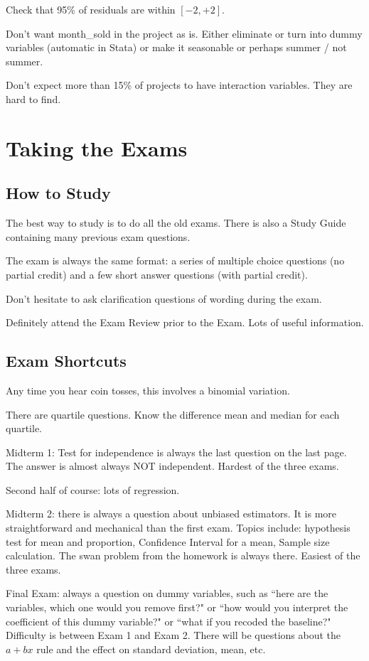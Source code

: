 \documentclass[11pt, oneside]{article}   	%
\begin{document}
Check that 95\% of residuals are within $[-2, +2]$.

Don't want month\_sold in the project as is. Either eliminate or turn into dummy variables  (automatic in Stata) or make it seasonable or perhaps summer / not summer.  

Don't expect more than 15\% of projects to have interaction variables. They are hard to find.


\section{Taking the Exams}
\subsection{How to Study}
The best way to study is to do all the old exams. There is also a Study Guide containing many previous exam questions.

The exam is always the same format: a series of multiple choice questions (no partial credit) and a few short answer questions (with partial credit).

Don't hesitate to ask clarification questions of wording during the exam.

Definitely attend the Exam Review prior to the Exam. Lots of useful information.

\subsection{Exam Shortcuts}

Any time you hear coin tosses, this involves a binomial variation.

There are quartile questions. Know the difference mean and median for each quartile. 

Midterm 1: Test for independence is always the last question on the last page. The answer is almost always NOT independent. Hardest of the three exams.

Second half of course: lots of regression.

Midterm 2: there is always a question about unbiased estimators. It is more straightforward and mechanical than the first exam. Topics include: hypothesis test for mean and proportion, Confidence Interval for a mean, Sample size calculation. The swan problem from the homework is always there. Easiest of the three exams.

Final Exam: always a question on dummy variables, such as ``here are the variables, which one would you remove first?" or ``how would you interpret the coefficient of this dummy variable?" or ``what if you recoded the baseline?" Difficulty is between Exam 1 and Exam 2. There will be questions about the $a+bx$ rule and the effect on standard deviation, mean, etc.
\end{document}

